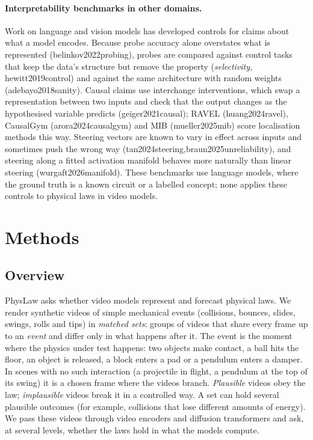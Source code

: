 \documentclass[10pt]{article}
\providecommand{\citep}[1]{(\textsf{#1})}
\providecommand{\citealp}[1]{\textsf{#1}}
\begin{document}
\paragraph{Interpretability benchmarks in other domains.}
Work on language and vision models has developed controls for claims about what a model encodes. Because probe
accuracy alone overstates what is represented \citep{belinkov2022probing}, probes are compared against control tasks
that keep the data's structure but remove the property (\emph{selectivity}, \citealp{hewitt2019control}) and against
the same architecture with random weights \citep{adebayo2018sanity}. Causal claims use interchange interventions,
which swap a representation between two inputs and check that the output changes as the hypothesised variable
predicts \citep{geiger2021causal}; RAVEL \citep{huang2024ravel}, CausalGym \citep{arora2024causalgym}
and MIB \citep{mueller2025mib} score localisation methods this way. Steering vectors are
known to vary in effect across inputs and sometimes push the wrong way \citep{tan2024steering,braun2025unreliability},
and steering along a fitted activation manifold behaves more naturally than linear steering
\citep{wurgaft2026manifold}. These benchmarks use language models, where the ground truth is a known circuit or a
labelled concept; none applies these controls to physical laws in video models.

\section{Methods}
\label{sec:methods}

\subsection{Overview}
PhysLaw asks whether video models represent and forecast physical laws. We render synthetic videos of simple
mechanical events (collisions, bounces, slides, swings, rolls and tips) in \emph{matched sets}: groups of
videos that share every frame up to an \emph{event} and differ only in what happens after it. The event is the
moment where the physics under test happens: two objects make contact, a ball hits the floor, an object is released,
a block enters a pad or a pendulum enters a damper. In scenes with no such interaction (a projectile in flight, a
pendulum at the top of its swing) it is a chosen frame where the videos branch. \emph{Plausible} videos obey
the law; \emph{implausible} videos break it in a controlled way. A set can hold several plausible outcomes (for
example, collisions that lose different amounts of energy). We pass these videos through video encoders and diffusion transformers and
ask, at several levels, whether the laws hold in what the models compute.
\end{document}
